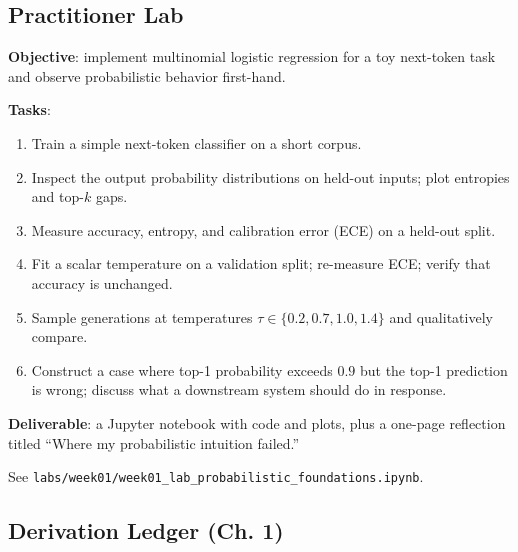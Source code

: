 \subsection{Practitioner Lab}

\textbf{Objective}: implement multinomial logistic regression for a toy next-token task and observe probabilistic behavior first-hand.

\textbf{Tasks}:
\begin{enumerate}
  \item Train a simple next-token classifier on a short corpus.
  \item Inspect the output probability distributions on held-out inputs; plot entropies and top-$k$ gaps.
  \item Measure accuracy, entropy, and calibration error (ECE) on a held-out split.
  \item Fit a scalar temperature on a validation split; re-measure ECE; verify that accuracy is unchanged.
  \item Sample generations at temperatures $\tau \in \{0.2, 0.7, 1.0, 1.4\}$ and qualitatively compare.
  \item Construct a case where top-1 probability exceeds $0.9$ but the top-1 prediction is wrong; discuss what a downstream system should do in response.
\end{enumerate}

\textbf{Deliverable}: a Jupyter notebook with code and plots, plus a one-page reflection titled ``Where my probabilistic intuition failed.''

See \texttt{labs/week01/week01\_lab\_probabilistic\_foundations.ipynb}.

\subsection*{Derivation Ledger (Ch. 1)}

